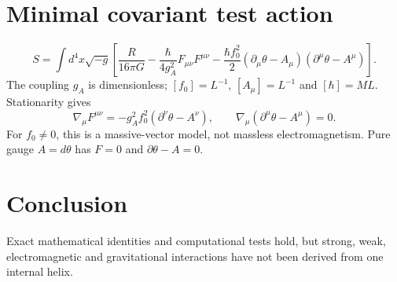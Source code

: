 \documentclass[11pt]{article}
\begin{document}
\section{Minimal covariant test action}
\begin{equation}
S=\int d^4x\sqrt{-g}\left[\frac{R}{16\pi G}
-\frac{\hbar}{4g_A^2}F_{\mu\nu}F^{\mu\nu}
-\frac{\hbar f_0^2}{2}(\partial_\mu\theta-A_\mu)(\partial^\mu\theta-A^\mu)\right].
\end{equation}
The coupling $g_A$ is dimensionless; $[f_0]=L^{-1}$, $[A_\mu]=L^{-1}$ and $[\hbar]=ML$.
Stationarity gives
\begin{equation}
\boxed{\nabla_\mu F^{\mu\nu}=-g_A^2f_0^2(\partial^\nu\theta-A^\nu),\qquad
\nabla_\mu(\partial^\mu\theta-A^\mu)=0.}
\end{equation}
For $f_0\neq0$, this is a massive-vector model, not massless electromagnetism.
Pure gauge $A=d\theta$ has $F=0$ and $\partial\theta-A=0$.
\section{Conclusion}
Exact mathematical identities and computational tests hold, but strong, weak, electromagnetic and gravitational interactions have not been derived from one internal helix.
\end{document}
